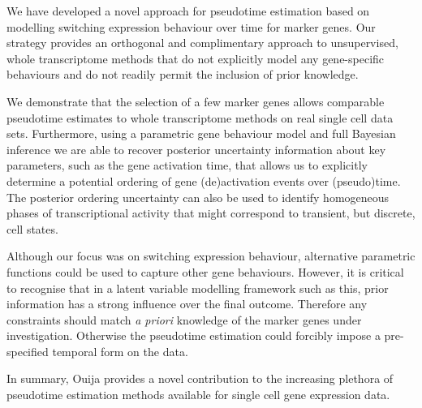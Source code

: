 We have developed a novel approach for pseudotime estimation based on modelling switching expression behaviour over time for marker genes. Our strategy provides an orthogonal and complimentary approach to unsupervised, whole transcriptome methods that do not explicitly model any gene-specific behaviours and do not readily permit the inclusion of prior knowledge.

We demonstrate that the selection of a few marker genes allows comparable pseudotime estimates to whole transcriptome methods on real single cell data sets. Furthermore, using a parametric gene behaviour model and full Bayesian inference we are able to recover posterior uncertainty information about key parameters, such as the gene activation time, that allows us to explicitly determine a potential ordering of gene (de)activation events over (pseudo)time. The posterior ordering uncertainty can also be used to identify homogeneous phases of transcriptional activity that might correspond to transient, but discrete, cell states.

Although our focus was on switching expression behaviour, alternative parametric functions could be used to capture other gene behaviours. However, it is critical to recognise that in a latent variable modelling framework such as this, prior information has a strong influence over the final outcome. Therefore any constraints should match \emph{a priori} knowledge of the marker genes under investigation. Otherwise the pseudotime estimation could forcibly impose a pre-specified temporal form on the data. 

In summary, Ouija provides a novel contribution to the increasing plethora of pseudotime estimation methods available for single cell gene expression data.
